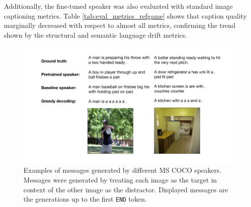 Additionally, the fine-tuned speaker was also evaluated with standard image captioning metrics. Table \ref{tab:eval_metrics_refgame} shows that caption quality marginally decreased with respect to almost all metrics, confirming the trend shown by the structural and semantic language drift metrics. 

\begin{figure}[h]
	\centering
	\includegraphics[width=\linewidth]{images/example_generations/coco_speakers_randomPairs_examples.pdf}
	\caption{Examples of messages generated by different MS COCO speakers. Messages were generated by treating each image as the target in context of the other image as the distractor. Displayed messages are the generations up to the first \texttt{END} token.}
	\label{fig:coco_randPairs_speaker_generations}
\end{figure}

